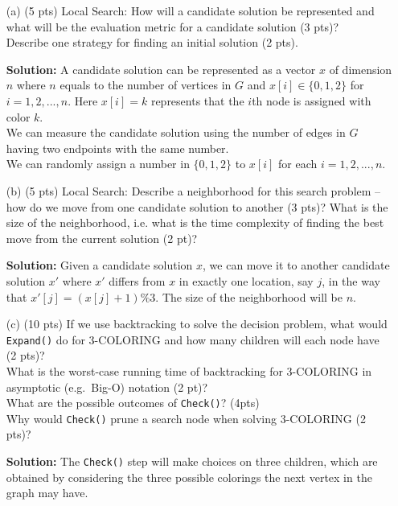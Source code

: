 \documentclass{article}
\begin{document}
\begin{itemize}

\item [(a)] (5 pts) Local Search: How will a candidate solution be represented and what will be the evaluation metric for a candidate solution (3 pts)? \\
Describe one strategy for finding an initial solution (2 pts).
\begin{tcolorbox}
\textbf{Solution:} A candidate solution can be represented as a vector $x$ of dimension $n$ where $n$ equals to the number of vertices in $G$ and $x[i] \in \{0, 1, 2\}$ for $i = 1, 2, ..., n$. Here $x[i] = k$ represents that the $i$th node is assigned with color $k$. \\

We can measure the candidate solution using the number of edges in $G$ having two endpoints with the same number.\\ 

We can randomly assign a number in $\{0,1, 2\}$ to $x[i]$ for each $i = 1, 2, ..., n$. 
\end{tcolorbox}

\item[(b)]  (5 pts) Local Search: Describe a neighborhood for this search problem -- how
do we move from one candidate solution to another (3 pts)? What is the size of the
neighborhood, i.e. what is the time complexity of finding the best move from
the current solution (2 pt)?
\begin{tcolorbox}
\textbf{Solution:} Given a candidate solution $x$, we can move it to another candidate solution $x'$ where $x'$ differs from $x$ in exactly one location, say $j$,  in the way that $x'[j] = (x[j] + 1) \% 3$. The size of the neighborhood will be $n$. 
\end{tcolorbox}

\item[(c)] (10 pts) If we use backtracking to solve the decision problem, what would
    \texttt{Expand()} do for 3-COLORING and how many children will each
        node have (2 pts)?\\
        What is the worst-case running time of backtracking for
        3-COLORING in asymptotic (e.g.\ Big-O) notation (2 pt)? \\
        What are the
        possible outcomes of \texttt{Check()}? (4pts)\\
        Why would \texttt{Check()} prune a search node when solving 3-COLORING (2 pts)?
\begin{tcolorbox}
\textbf{Solution:} 
The \texttt{Check()} step will make choices on three children, which are obtained by considering the three possible colorings the next vertex in the graph may have. \\


\end{tcolorbox}
\end{itemize}
\end{document}
